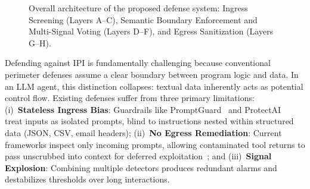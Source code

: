 \documentclass[runningheads]{llncs}
\begin{document}
\begin{figure}[t]
{%
}
\caption{Overall architecture of the proposed defense system: Ingress Screening (Layers A--C), Semantic Boundary Enforcement and Multi-Signal Voting (Layers D--F), and Egress Sanitization (Layers G--H).}
\label{fig:arch_overview}
\end{figure}

Defending against IPI is fundamentally challenging because conventional perimeter defenses assume a clear boundary between program logic and data. In an LLM agent, this distinction collapses: textual data inherently acts as potential control flow. Existing defenses suffer from three primary limitations: (i)~\textbf{Stateless Ingress Bias}: Guardrails like PromptGuard~\cite{llamafirewall2024} and ProtectAI~\cite{protectai2024} treat inputs as isolated prompts, blind to instructions nested within structured data (JSON, CSV, email headers); (ii)~\textbf{No Egress Remediation}: Current frameworks inspect only incoming prompts, allowing contaminated tool returns to pass unscrubbed into context for deferred exploitation~\cite{zhan2025injecagent}; and (iii)~\textbf{Signal Explosion}: Combining multiple detectors produces redundant alarms and destabilizes thresholds over long interactions.
\end{document}
